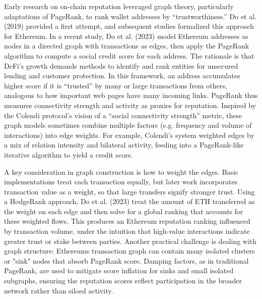 \documentclass[
]{article}
\begin{document}
Early research on on-chain reputation leveraged graph theory, particularly adaptations of PageRank, to rank wallet addresses by ``trustworthiness.'' Do et al. (2019) provided a first attempt, and subsequent studies formalized this approach for Ethereum. In a recent study, Do et al. (2023) model Ethereum addresses as nodes in a directed graph with transactions as edges, then apply the PageRank algorithm to compute a social credit score for each address. The rationale is that DeFi's growth demands methods to identify and rank entities for unsecured lending and customer protection. In this framework, an address accumulates higher score if it is ``trusted'' by many or large transactions from others, analogous to how important web pages have many incoming links. PageRank thus measures connectivity strength and activity as proxies for reputation. Inspired by the Colendi protocol's vision of a ``social connectivity strength'' metric, these graph models sometimes combine multiple factors (e.g. frequency and volume of interactions) into edge weights. For example, Colendi's system weighted edges by a mix of relation intensity and bilateral activity, feeding into a PageRank-like iterative algorithm to yield a credit score.

A key consideration in graph construction is how to weight the edges. Basic implementations treat each transaction equally, but later work incorporates transaction value as a weight, so that large transfers signify stronger trust. Using a HodgeRank approach, Do et al. (2023) treat the amount of ETH transferred as the weight on each edge and then solve for a global ranking that accounts for these weighted flows. This produces an Ethereum reputation ranking influenced by transaction volume, under the intuition that high-value interactions indicate greater trust or stake between parties. Another practical challenge is dealing with graph structure: Ethereum\textquotesingle s transaction graph can contain many isolated clusters or "sink" nodes that absorb PageRank score. Damping factors, as in traditional PageRank, are used to mitigate score inflation for sinks and small isolated subgraphs, ensuring the reputation scores reflect participation in the broader network rather than siloed activity.
\end{document}
